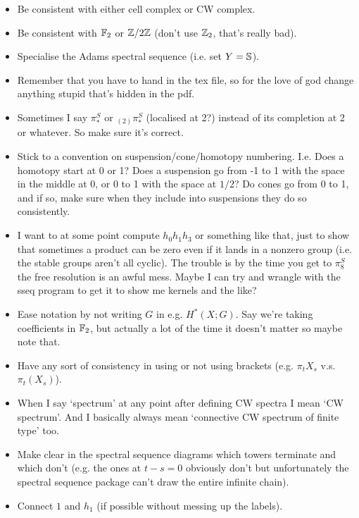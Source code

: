\documentclass{MetricNotes2023}
\def\bb{\ensuremath\mathbb}
\def\inte{\ensuremath\mathbb{Z}}
\begin{document}
\begin{itemize}
\item Be consistent with either cell complex or CW complex.

\item Be consistent with \(\bb{F}_2\)  or \(\inte/2\inte\) (don't use \(\inte_2\), that's really bad).

\item Specialise the Adams spectral sequence (i.e. set \(Y=\bb{S}\)).

\item Remember that you have to hand in the tex file, so for the love of god change anything stupid that's hidden in the pdf.

\item Sometimes I say \(\pi_*^S\) or \(\text{}_{(2)}\pi_*^S\) (localised at 2?) instead of its completion at 2 or whatever. So make sure it's correct.

\item Stick to a convention on suspension/cone/homotopy numbering. I.e. Does a homotopy start at 0 or 1? Does a suspension go from -1 to 1 with the space in the middle at 0, or 0 to 1 with the space at \(1/2\)? Do cones go from 0 to 1, and if so, make sure when they include into suspensions they do so consistently. 

\item I want to at some point compute \(h_0h_1h_3\) or something like that, just to show that sometimes a product can be zero even if it lands in a nonzero group (i.e. the stable groups aren't all cyclic). The trouble is by the time you get to \(\pi_8^S\) the free resolution is an awful mess. Maybe I can try and wrangle with the sseq program to get it to show me kernels and the like?

\item Ease notation by not writing \(G\) in e.g. \(H^*(X;G)\). Say we're taking coefficients in \(\bb{F}_2\), but actually a lot of the time it doesn't matter so maybe note that.

\item Have any sort of consistency in using or not using brackets (e.g. \(\pi_t X_s\) v.s. \(\pi_t(X_s)\)). 

\item When I say `spectrum' at any point after defining CW spectra I mean `CW spectrum'. And I basically always mean `connective CW spectrum of finite type' too. 

\item Make clear in the spectral sequence diagrams which towers terminate and which don't (e.g. the ones at \(t-s=0\) obviously don't but unfortunately the spectral sequence package can't draw the entire infinite chain).

\item Connect \(1\) and \(h_1\) (if possible without messing up the labels). 

\end{itemize}
\end{document}
